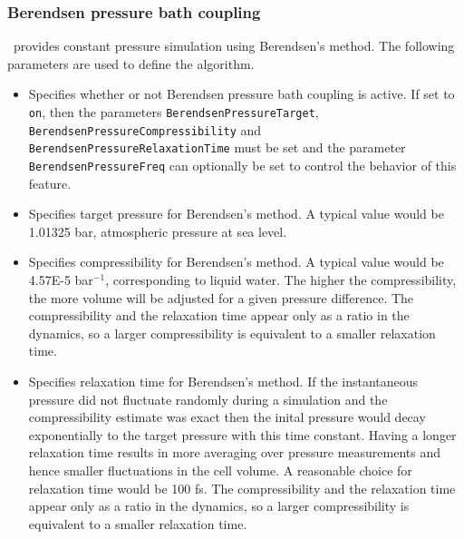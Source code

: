 \subsubsection{Berendsen pressure bath coupling}

\NAMD\ provides constant pressure simulation using Berendsen's method.  
The following parameters are used to define the algorithm.  

\begin{itemize}

\item
{}
{Specifies whether or not Berendsen pressure bath coupling is active.  
If set to {\tt on}, then the parameters {\tt BerendsenPressureTarget}, {\tt BerendsenPressureCompressibility} and {\tt BerendsenPressureRelaxationTime} must be set 
and the parameter {\tt BerendsenPressureFreq} can
optionally be set to control the behavior of this feature.} 

\item
{}
{Specifies target pressure for Berendsen's method.
A typical value would be 1.01325 bar, atmospheric pressure at sea level.}

\item
{}
{Specifies compressibility for Berendsen's method.
A typical value would be 4.57E-5 bar$^{-1}$, corresponding to liquid water.
The higher the compressibility, the more volume will be adjusted for a
given pressure difference.
The compressibility and the relaxation time appear only as a ratio in the
dynamics, so a larger compressibility is equivalent to a smaller relaxation
time.}

\item
{}
{Specifies relaxation time for Berendsen's method.
If the instantaneous pressure did not fluctuate randomly during a simulation
and the compressibility estimate was exact then
the inital pressure would decay exponentially to the target pressure with
this time constant.
Having a longer relaxation time results in more averaging over pressure
measurements and hence smaller fluctuations in the cell volume.
A reasonable choice for relaxation time would be 100 fs.
The compressibility and the relaxation time appear only as a ratio in the
dynamics, so a larger compressibility is equivalent to a smaller relaxation
time.}


\end{itemize}
